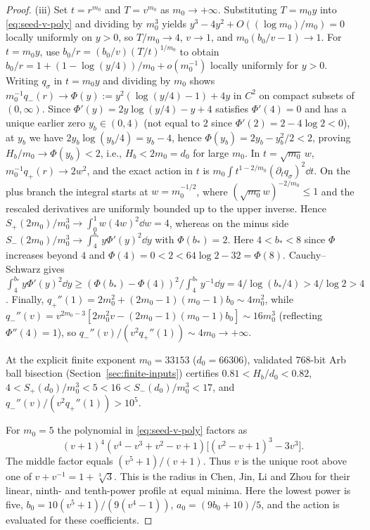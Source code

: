 \begin{proof}
(iii) Set $t=r^{m_0}$ and $T=v^{m_0}$ as $m_0\to+\infty$. Substituting $T=m_0 y$ into
\eqref{eq:seed-v-poly} and dividing by $m_0^3$ yields $y^3-4y^2+O((\log m_0)/m_0)=0$ locally uniformly
on $y>0$, so $T/m_0\to 4$, $v\to 1$, and $m_0(b_0/v-1)\to 1$. For
$t=m_0y$, use $b_0/r=(b_0/v)(T/t)^{1/m_0}$ to obtain
$b_0/r=1+(1-\log(y/4))/m_0+o(m_0^{-1})$ locally uniformly for $y>0$.
Writing $q_\sigma$ in $t=m_0 y$ and
dividing by $m_0$ shows $m_0^{-1}q_-(r)\to \Phi(y):=y^2(\log(y/4)-1)+4y$ in $C^2$ on compact subsets
of $(0,\infty)$. Since $\Phi'(y)=2y\log(y/4)-y+4$ satisfies $\Phi'(4)=0$ and has a unique earlier zero
$y_b\in(0,4)$ (not equal to $2$ since $\Phi'(2)=2-4\log 2<0$), at $y_b$ we have
$2y_b\log(y_b/4)=y_b-4$, hence $\Phi(y_b)=2y_b-y_b^2/2<2$, proving $H_b/m_0\to\Phi(y_b)<2$, i.e.,
$H_b<2m_0=d_0$ for large $m_0$. In $t=\sqrt{m_0}\,w$, $m_0^{-1}q_+(r)\to 2w^2$, and the exact action
in $t$ is
$m_0\int t^{1-2/m_0}(\partial_t q_\sigma)^2\dd t$.
On the plus branch the integral starts at $w=m_0^{-1/2}$, where
$(\sqrt{m_0}w)^{-2/m_0}\le1$ and the rescaled derivatives are uniformly
bounded up to the upper inverse. Hence $S_+(2m_0)/m_0^3\to \int_0^1 w(4w)^2\dd w=4$, whereas on the
minus side $S_-(2m_0)/m_0^3\to \int_4^{b_*} y\Phi'(y)^2\dd y$ with $\Phi(b_*)=2$.
Here $4<b_*<8$ since $\Phi$ increases beyond $4$ and
$\Phi(4)=0<2<64\log 2-32=\Phi(8)$. Cauchy--Schwarz gives
$\int_4^{b_*}y\Phi'(y)^2\dd y \ge
(\Phi(b_*)-\Phi(4))^2/\int_4^{b_*}y^{-1}\dd y = 4/\log(b_*/4) > 4/\log 2 > 4$. Finally,
$q_+''(1)=2m_0^2+(2m_0-1)(m_0-1)b_0\sim 4m_0^2$, while $q_-''(v)=v^{2m_0-3}[2m_0^2
v-(2m_0-1)(m_0-1)b_0]\sim 16m_0^3$ (reflecting $\Phi''(4)=1$), so $q_-''(v)/(v^2 q_+''(1))\sim
4m_0\to+\infty$.

At the explicit finite exponent $m_0=33153$ ($d_0=66306$), validated 768-bit Arb ball bisection
\cite{Johansson2017} (Section~\ref{sec:finite-inputs}) certifies $0.81<H_b/d_0<0.82$,
$4<S_+(d_0)/m_0^3<5<16<S_-(d_0)/m_0^3<17$, and $q_-''(v)/(v^2 q_+''(1))>10^5$.

For $m_0=5$ the polynomial in \eqref{eq:seed-v-poly} factors as
\[
 (v+1)^4(v^4-v^3+v^2-v+1)\bigl[(v^2-v+1)^3-3v^3\bigr].
\]
The middle factor equals $(v^5+1)/(v+1)$. Thus $v$ is the unique
root above one of $v+v^{-1}=1+\sqrt[3]{3}$. This is the radius in
Chen, Jin, Li and Zhou \cite[(3.14)--(3.16)]{CJLZ} for their linear,
ninth- and tenth-power profile at equal minima. Here the lowest power
is five, $b_0=10(v^5+1)/(9(v^4-1))$, $a_0=(9b_0+10)/5$, and
the action is evaluated for these coefficients.


\end{proof}
